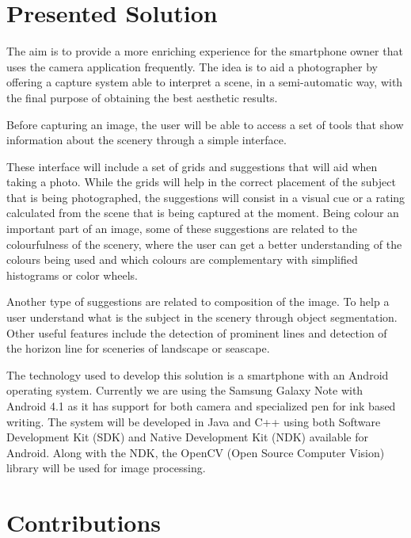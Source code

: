 \section{Presented Solution}
\label{sec:solution}

The aim is to provide a more enriching experience for the smartphone owner that uses the camera application frequently. The idea is to aid a photographer by offering a capture system able to interpret a scene, in a semi-automatic way, with the final purpose of obtaining the best aesthetic results.

Before capturing an image, the user will be able to access a set of tools that show information about the scenery through a simple interface.

These interface will include a set of grids and suggestions that will aid when taking a photo. While the grids will help in the correct placement of the subject that is being photographed, the suggestions will consist in a visual cue or a rating calculated from the scene that is being captured at the moment.
Being colour an important part of an image, some of these suggestions are related to the colourfulness of the scenery, where the user can get a better understanding of the colours being used and which colours are complementary with simplified histograms or color wheels.

Another type of suggestions are related to composition of the image. To help a user understand what is the subject in the scenery through object segmentation. Other useful features include the detection of prominent lines and detection of the horizon line for sceneries of landscape or seascape.

The technology used to develop this solution is a smartphone with an Android operating system. Currently we are using the Samsung Galaxy Note with Android 4.1 as it has support for both camera and specialized pen for ink based writing. The system will be developed in Java and C++ using both Software Development Kit (SDK) \cite{SDK} and Native Development Kit (NDK) \cite{NDK} available for Android.  Along with the NDK, the OpenCV (Open Source Computer Vision) \cite{OCV} library will be used for image processing.

\section{Contributions}
\label{sec:contributions}

